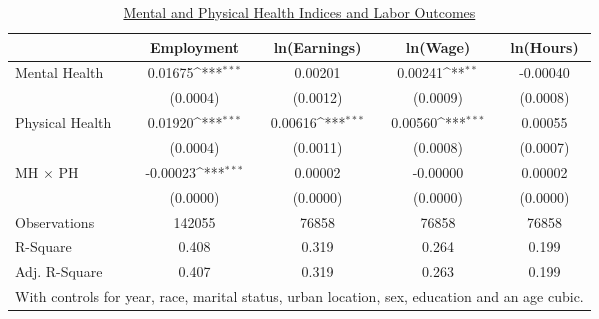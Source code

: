 \def\sym#1{\ifmmode^{#1}\else\(^{#1}\)\fi}
\begin{table}
\center\caption*{\large{\underline{Mental and Physical Health Indices and Labor Outcomes}}}
\vspace{0.2cm}
\begin{tabular}{l*{4}{c}}
                    &\multicolumn{1}{c}{Employment}&\multicolumn{1}{c}{ln(Earnings)}&\multicolumn{1}{c}{ln(Wage)}&\multicolumn{1}{c}{ln(Hours)}\\
\midrule
Mental Health       &     0.01675\sym{***}&     0.00201         &     0.00241\sym{**} &    -0.00040         \\
                    &    (0.0004)         &    (0.0012)         &    (0.0009)         &    (0.0008)         \\
Physical Health     &     0.01920\sym{***}&     0.00616\sym{***}&     0.00560\sym{***}&     0.00055         \\
                    &    (0.0004)         &    (0.0011)         &    (0.0008)         &    (0.0007)         \\
MH $\times$ PH      &    -0.00023\sym{***}&     0.00002         &    -0.00000         &     0.00002         \\
                    &    (0.0000)         &    (0.0000)         &    (0.0000)         &    (0.0000)         \\
\midrule
Observations        &      142055         &       76858         &       76858         &       76858         \\
R-Square            &       0.408         &       0.319         &       0.264         &       0.199         \\
Adj. R-Square       &       0.407         &       0.319         &       0.263         &       0.199         \\
\bottomrule
\multicolumn{5}{l}{\scriptsize{With controls for year, race, marital status, urban location, sex, education and an age cubic.}} \\
\end{tabular}
\end{table}
